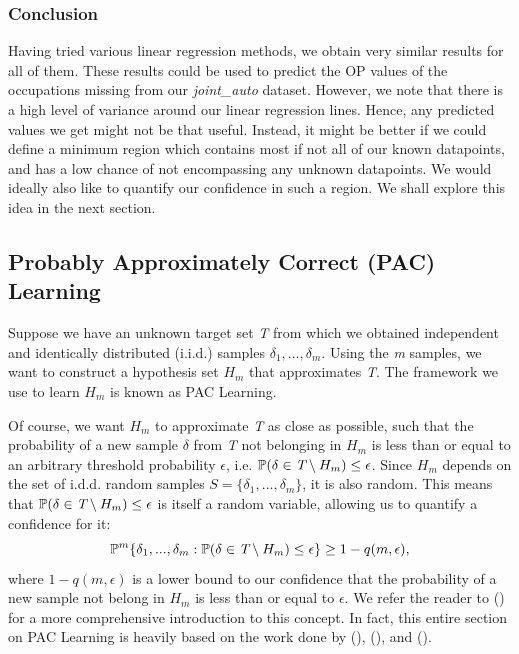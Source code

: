\documentclass[11pt]{article}
\begin{document}
\subsubsection*{Conclusion}
Having tried various linear regression methods, we obtain very similar results for all of them. These results could be used to predict the OP values of the occupations missing from our \emph{joint\_auto} dataset. However, we note that there is a high level of variance around our linear regression lines. Hence, any predicted values we get might not be that useful. Instead, it might be better if we could define a minimum region which contains most if not all of our known datapoints, and has a low chance of not encompassing any unknown datapoints. We would ideally also like to quantify our confidence in such a region. We shall explore this idea in the next section.


\subsection{Probably Approximately Correct (PAC) Learning}
\label{subsec:PAC}
Suppose we have an unknown target set \emph{T} from which we obtained independent and identically distributed (i.i.d.) samples $\delta_{1},...,\delta_{m}$. Using the \emph{m} samples, we want to construct a hypothesis set $H_{m}$ that approximates \emph{T}. The framework we use to learn $H_{m}$ is known as PAC Learning.

Of course, we want $H_{m}$ to approximate \emph{T} as close as possible, such that the probability of a new sample $\delta$ from \emph{T} not belonging in $H_{m}$ is less than or equal to an arbitrary threshold probability $\epsilon$, i.e. $\mathbb{P}(\delta \in \emph{T} \setminus H_{m}) \leq \epsilon$. Since $H_{m}$ depends on the set of i.d.d. random samples $S = \{\delta_{1},...,\delta_{m}\}$, it is also random. This means that $\mathbb{P}(\delta \in \emph{T} \setminus H_{m}) \leq \epsilon$ is itself a random variable, allowing us to quantify a confidence for it:
\begin{equation}
	\label{eq:1}
	\mathbb{P}^{m} \{\delta_{1},...,\delta_{m}: \mathbb{P}(\delta \in \emph{T} \setminus H_{m}) \leq \epsilon \} \geq 1 - q(m,\epsilon),
\end{equation}
where $1 - q(m,\epsilon)$ is a lower bound to our confidence that the probability of a new sample not belong in $H_{m}$ is less than or equal to $\epsilon$. We refer the reader to (\cite{paclearning1}) for a more comprehensive introduction to this concept. In fact, this entire section on PAC Learning is heavily based on the work done by (\cite{paclearning1}), (\cite{romao2021tight}), and (\cite{kostas}).
\end{document}
